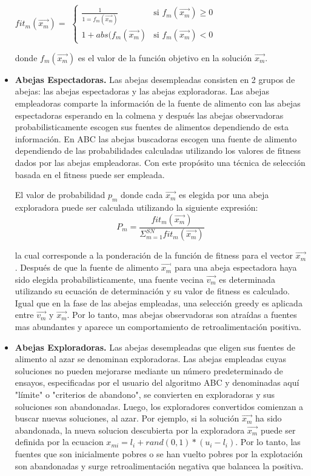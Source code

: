 \documentclass{article}
\begin{document}
\begin{itemize}
    \begin{center}
    $fit_m(\vec{x_m})=$
    \begin{math}
      \left\{
        \begin{array}{ll}
          \frac{1}{1=f_m(\vec{x_m})} & \mbox{si $f_m(\vec{x_m}) \geq 0$}\\
          1+abs(f_m(\vec{x_m}) & \mbox{si $f_m(\vec{x_m}) < 0$}
        \end{array}
      \right.
    \end{math}
    \end{center}
    donde $f_m(\vec{x_m})$ es el valor de la función objetivo en la solución $\vec{x_m}$.
    
    \item \textbf{Abejas Espectadoras.}
    Las abejas desempleadas consisten en 2 grupos de abejas: las abejas espectadoras y las abejas exploradoras. Las abejas empleadoras comparte la informaci\'on de la fuente de alimento con las abejas espectadoras esperando en la colmena y después las abejas observadoras probabilisticamente escogen sus fuentes de alimentos dependiendo de esta informaci\'on. En ABC las abejas buscadoras escogen una fuente de alimento dependiendo de las probabilidades calculadas utilizando los valores de fitness dados por las abejas empleadoras. Con este propósito una técnica de selección basada en el fitness puede ser empleada.
    
    \medskip
    
    El valor de probabilidad $p_m$ donde cada $\vec{x_m}$ es elegida por una abeja exploradora puede ser calculada utilizando la siguiente expresión: 
    $$P_m=\frac{fit_m(\vec{x_m})}{\Sigma_{m=1}^{SN}fit_m(\vec{x_m})}$$
    
    la cual corresponde a la ponderación de la función de fitness para el vector  $\vec{x_m}$. Después de que la fuente de alimento $\vec{x_m}$ para una abeja espectadora haya sido elegida probabilisticamente, una fuente vecina $\vec{v_m}$ es determinada utilizando su ecuación de determinación y su valor de fitness es calculado. Igual que en la fase de las abejas empleadas, una selección greedy es aplicada entre $\vec{v_m}$ y $\vec{x_m}$. Por lo tanto, mas abejas observadoras son atraídas a fuentes mas abundantes y aparece un comportamiento de retroalimentación positiva. 
    
    \item \textbf{Abejas Exploradoras.}
    Las abejas desempleadas que eligen sus fuentes de alimento al azar se denominan exploradoras. Las abejas empleadas cuyas soluciones no pueden mejorarse mediante un número predeterminado de ensayos, especificadas por el usuario del algoritmo ABC y denominadas aquí "límite" o "criterios de abandono", se convierten en exploradoras y sus soluciones son abandonadas. Luego, los exploradores convertidos comienzan a buscar nuevas soluciones, al azar. Por ejemplo, si la solución $\vec{x_m}$ ha sido abandonada, la nueva solucion  descubierta por la exploradora $\vec{x_m}$ puede ser definida por la ecuacion  $x_{mi}=l_i+rand(0,1)*(u_i-l_i)$. Por lo tanto, las fuentes que son inicialmente pobres o se han vuelto pobres por la explotación son abandonadas y surge retroalimentación negativa que balancea la positiva. 
    

\end{itemize}
\end{document}
